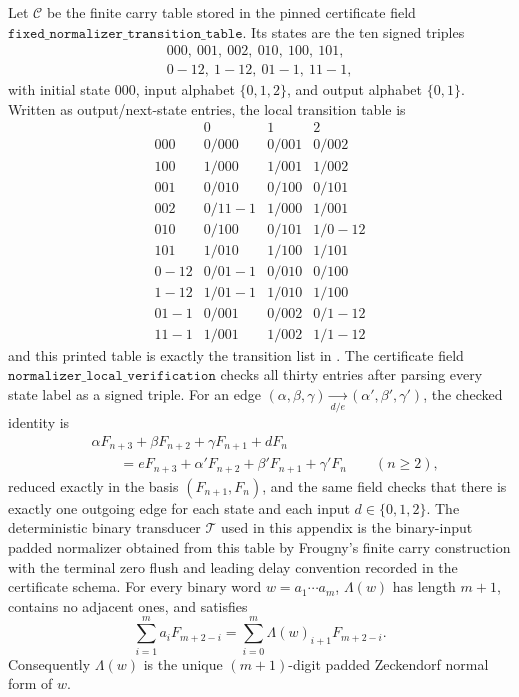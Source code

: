 \begin{theorem}
\label{thm:pinned-padded-normalizer-soundness}
Let \(\mathcal C\) be the finite carry table stored in the pinned certificate
field \(\texttt{fixed\_normalizer\_transition\_table}\).  Its states are the ten
signed triples
\[
\begin{gathered}
000,\ 001,\ 002,\ 010,\ 100,\ 101,\\
0{-}12,\ 1{-}12,\ 01{-}1,\ 11{-}1,
\end{gathered}
\]
with initial state \(000\), input alphabet \(\{0,1,2\}\), and output alphabet
\(\{0,1\}\).  Written as output/next-state entries, the local transition table
is
\[
\begin{array}{c|ccc}
&0&1&2\\
\hline
000&0/000&0/001&0/002\\
100&1/000&1/001&1/002\\
001&0/010&0/100&0/101\\
002&0/11{-}1&1/000&1/001\\
010&0/100&0/101&1/0{-}12\\
101&1/010&1/100&1/101\\
0{-}12&0/01{-}1&0/010&0/100\\
1{-}12&1/01{-}1&1/010&1/100\\
01{-}1&0/001&0/002&0/1{-}12\\
11{-}1&1/001&1/002&1/1{-}12
\end{array}
\]
and this printed table is exactly the transition list in
.  The certificate field
\(\texttt{normalizer\_local\_verification}\) checks all thirty entries after
parsing every state label as a signed triple.  For an edge
\((\alpha,\beta,\gamma)\xrightarrow[d/e]{}
(\alpha',\beta',\gamma')\), the checked identity is
\[
  \begin{aligned}
  &\alpha F_{n+3}+\beta F_{n+2}+\gamma F_{n+1}+dF_n\\
  &\qquad =
  eF_{n+3}+\alpha'F_{n+2}+\beta'F_{n+1}+\gamma'F_n
  \qquad(n\ge2),
  \end{aligned}
\]
reduced exactly in the basis \((F_{n+1},F_n)\), and the same field checks that
there is exactly one outgoing edge for each state and each input
\(d\in\{0,1,2\}\).  The deterministic binary transducer \(\mathcal T\) used in this
appendix is the binary-input padded normalizer obtained from this table by
Frougny's finite carry construction with the terminal zero flush and leading
delay convention recorded in the certificate schema.  For every binary word
\(w=a_1\cdots a_m\), \(\Lambda(w)\) has length \(m+1\), contains no adjacent
ones, and satisfies
\[
  \sum_{i=1}^m a_iF_{m+2-i}
  =
  \sum_{i=0}^m \Lambda(w)_{i+1}F_{m+2-i}.
\]
Consequently \(\Lambda(w)\) is the unique \((m+1)\)-digit padded Zeckendorf
normal form of \(w\).
\end{theorem}

